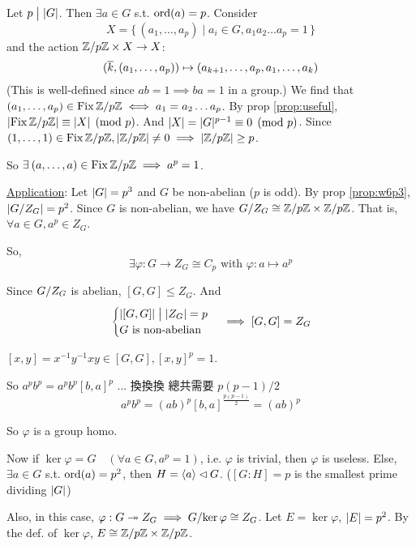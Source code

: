 \begin{theorem}
  Let $p \Div \abs{G}$. Then $\exists a \in G$ s.t. $\ord(a) = p$. Consider
  \[ X = \{\, (a_1, \dots, a_p) \mid a_i \in G, a_1a_2\dots a_p = 1\,\} \]
  and the action $\quot{\Zb}{p\Zb} \times X \to X$:
  \[
    (\ob{k}, (a_1, \dots, a_p)) \mapsto (a_{k+1}, \dots, a_p, a_1, \dots, a_k)
  \]
  (This is well-defined since $ab = 1 \implies ba = 1$ in a group.)
  We find that $(a_1, \dots, a_p) \in \Fix \quot{\Zb}{p\Zb} \iff a_1 = a_2
  \dots a_p$.
  By prop \ref{prop:useful}, $\abs*{\Fix \quot{\Zb}{p\Zb}} \equiv \abs{X}
  \pmod p$. And $\abs{X} = \abs{G}^{p-1} \equiv 0 \pmod p$.
  Since $(1, \dots, 1) \in \Fix \quot{\Zb}{p\Zb}, \abs*{\quot{\Zb}{p\Zb}} \ne 0
  \implies \abs*{\quot{\Zb}{p\Zb}} \ge p$.

  So $\exists (a, \dots, a) \in \Fix \quot{\Zb}{p\Zb} \implies a^p = 1$.
\end{theorem}

\underline{Application}: Let $\abs{G} = p^3$ and $G$ be non-abelian
($p$ is odd).
By prop \ref{prop:w6p3}, $\abs*{\quot{G}{Z_G}} = p^2$. Since $G$ is non-abelian,
we have $\quot{G}{Z_G} \cong \quot{\Zb}{p\Zb} \times \quot{\Zb}{p\Zb}$.
That is, $\forall a \in G, a^p \in Z_G$.

So,
\[
  \exists \varphi: G \to Z_G \cong C_p \text{~with~}
  \varphi: a \mapsto a^p
\]

Since $\quot{G}{Z_G}$ is abelian, $[G,G] \le Z_G$. And
\[
  \begin{cases}
    \abs{[G,G]} \Div \abs{Z_G} = p \\
    G \text{~is non-abelian}
  \end{cases}
  \implies [G,G] = Z_G
\]

\begin{definition}
  $[x, y] = x^{-1}y^{-1}xy \in [G,G], [x,y]^p = 1$.
\end{definition}

So $a^p b^p = a^p b^p [b, a]^p$ ... 換換換 總共需要 $p(p-1)/2$
\[ a^p b^p = (ab)^p [b,a]^{\frac{p(p-1)}{2}} = (ab)^p \]

So $\varphi$ is a group homo.

Now if $\ker \varphi = G \quad (\forall a \in G, a^p = 1)$,
i.e. $\varphi$ is trivial, then $\varphi$ is useless.
Else, $\exists a \in G$ s.t. $\ord(a) = p^2$, then
$H = \gen{a} \lhd G$. ($[G:H] = p$ is the smallest prime dividing $\abs{G}$)

Also, in this case, $\varphi: G \onto Z_G \implies
\quot{G}{\ker \varphi} \cong Z_G$. Let $E = \ker \varphi$, $\abs{E} = p^2$.
By the def. of $\ker \varphi$, $E \cong \quot{\Zb}{p\Zb} \times
\quot{\Zb}{p\Zb}$.

